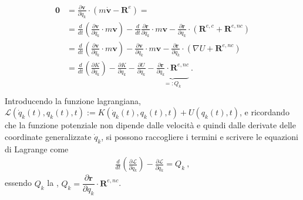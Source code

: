 \documentclass[letterpaper,10pt,english]{jupyterBook}
\begin{document}
\begin{equation*}
\begin{split}\begin{aligned}
\mathbf{0} & = \frac{\partial \mathbf{v}}{\partial \dot{q}_k} \cdot \left( m \dot{\mathbf{v}} - \mathbf{R}^e \right) = \\
& = \frac{d}{dt} \left( \frac{\partial \mathbf{v}}{\partial \dot{q}_k} \cdot m \mathbf{v} \right) - \frac{d}{dt} \frac{\partial \mathbf{r}}{\partial q_k} \cdot m \mathbf{v} - \frac{\partial \mathbf{r}}{\partial q_k} \cdot ( \mathbf{R}^{e,c} + \mathbf{R}^{e,nc} ) \\
& = \frac{d}{dt} \left( \frac{\partial \mathbf{v}}{\partial \dot{q}_k} \cdot m \mathbf{v} \right) - \frac{\partial \mathbf{v}}{\partial q_k} \cdot m \mathbf{v} - \frac{\partial \mathbf{r}}{\partial q_k} \cdot ( \nabla U + \mathbf{R}^{e,nc} ) \\
& = \frac{d}{dt} \left( \frac{\partial K}{\partial \dot{q}_k} \right) - \frac{\partial K}{\partial q_k} - \frac{\partial U}{\partial q_k} - \underbrace{\frac{\partial \mathbf{r}}{\partial q_k} \cdot \mathbf{R}^{e,nc}}_{=: Q_k} \ . \\
\end{aligned}\end{split}
\end{equation*}
\sphinxAtStartPar
Introducendo la funzione lagrangiana, \(\mathscr{L}(\dot{q}_k(t), q_k(t), t) := K(\dot{q}_k(t), q_k(t), t) + U(q_k(t),t)\), e ricordando che la funzione potenziale non dipende dalle velocità e quindi dalle derivate delle coordinate generalizzate \(\dot{q}_k\), si possono raccogliere i termini e scrivere le equazioni di Lagrange come
\begin{equation*}
\begin{split}\frac{d}{dt}\left(\frac{\partial \mathscr{L}}{\partial \dot{q}_k} \right) - \frac{\partial \mathscr{L}}{\partial q_k} = Q_k \ ,\end{split}
\end{equation*}
\sphinxAtStartPar
essendo \(Q_k\) la , \(Q_k = \dfrac{\partial \mathbf{r}}{\partial q_k} \cdot \mathbf{R}^{e,nc}\).

\sphinxstepscope
\end{document}
